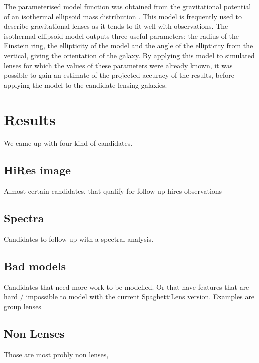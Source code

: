 \documentclass[fleqn,usenatbib]{mnras}
\begin{document}
The parameterised model function was obtained from the gravitational potential of an isothermal ellipsoid mass distribution \cite{2001astro.ph..2340K}.
This model is frequently used to describe gravitational lenses as it tends to fit well with observations.
The isothermal ellipsoid model outputs three useful parameters: the radius of the Einstein ring, the ellipticity of the model and the angle of the ellipticity from the vertical, giving the orientation of the galaxy.
By applying this model to simulated lenses for which the values of these parameters were already known, it was possible to gain an estimate of the projected accuracy of the results, before applying the model to the candidate lensing galaxies.





\section{Results}
We came up with four kind of candidates.

\subsection{HiRes image}
Almost certain candidates, that qualify for follow up hires observations



\subsection{Spectra}
Candidates to follow up with a spectral analysis. 


\subsection{Bad models}
Candidates that need more work to be modelled.
Or that have features that are hard / impossible to model with the current SpaghettiLens version.
Examples are group lenses



\subsection{Non Lenses}
Those are most probly non lenses, 
\end{document}
